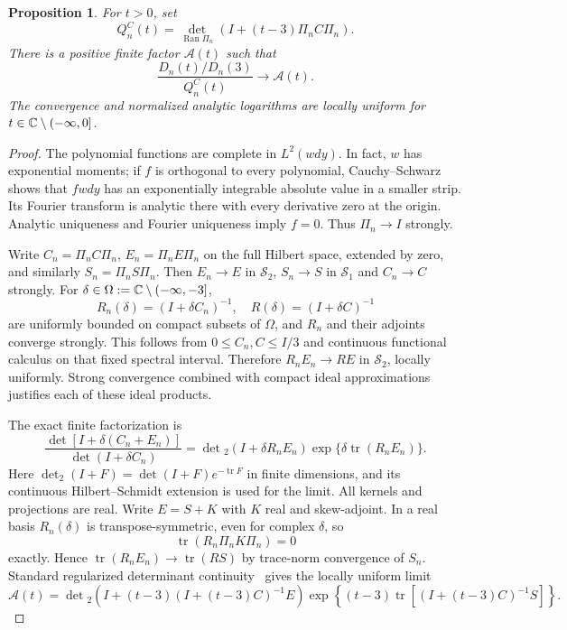 \documentclass[11pt,letterpaper]{article}
\newtheorem{proposition}[theorem]{Proposition}
\theoremstyle{remark}\newtheorem{remark}[theorem]{Remark}
\newcommand{\Sone}{\mathcal S_1}\newcommand{\Stwo}{\mathcal S_2}
\DeclareMathOperator{\tr}{tr}\DeclareMathOperator{\Ran}{Ran}
\begin{document}
\begin{proposition}\label{dsasm:log:relativeprop}
For $t>0$, set
\[
 Q_n^C(t)=\det_{\Ran\Pi_n}(I+(t-3)\Pi_n C\Pi_n).
\]
There is a positive finite factor $\mathcal A(t)$ such that
\begin{equation}\label{dsasm:log:relative}
 \frac{D_n(t)/D_n(3)}{Q_n^C(t)}\longrightarrow\mathcal A(t).
\end{equation}
The convergence and normalized analytic logarithms are locally
uniform for $t\in\mathbb C\setminus(-\infty,0]$.
\end{proposition}
\begin{proof}
The polynomial functions are complete in $L^2(wdy)$. In fact, $w$
has exponential moments; if $f$ is orthogonal to every polynomial,
Cauchy--Schwarz shows that $fwdy$ has an exponentially integrable
absolute value in a smaller strip. Its Fourier transform is analytic
there with every derivative zero at the origin. Analytic uniqueness
and Fourier uniqueness imply $f=0$. Thus $\Pi_n\to I$ strongly.

Write $C_n=\Pi_n C\Pi_n$, $E_n=\Pi_n E\Pi_n$ on the full Hilbert
space, extended by zero, and similarly $S_n=\Pi_n S\Pi_n$.
Then $E_n\to E$ in $\Stwo$, $S_n\to S$ in $\Sone$ and $C_n\to C$
strongly. For $\delta\in\Omega:=\mathbb C\setminus(-\infty,-3]$,
\[
 R_n(\delta)=(I+\delta C_n)^{-1},\quad R(\delta)=(I+\delta C)^{-1}
\]
are uniformly bounded on compact subsets of $\Omega$, and $R_n$ and
their adjoints converge strongly. This follows from
$0\le C_n,C\le I/3$ and continuous functional calculus on that fixed
spectral interval. Therefore $R_nE_n\to RE$ in $\Stwo$, locally
uniformly. Strong convergence combined with compact ideal
approximations justifies each of these ideal products.

The exact finite factorization is
\begin{equation}\label{dsasm:log:det2finite}
 \frac{\det[I+\delta(C_n+E_n)]}{\det(I+\delta C_n)}
 =\det{}_2(I+\delta R_nE_n)
       \exp\{\delta\tr(R_nE_n)\}.
\end{equation}
Here $\det_2(I+F)=\det(I+F)e^{-\tr F}$ in finite dimensions, and its
continuous Hilbert--Schmidt extension is used for the limit.
All kernels and projections are real. Write $E=S+K$ with $K$ real
and skew-adjoint. In a real basis $R_n(\delta)$ is transpose-symmetric,
even for complex $\delta$, so
\[
 \tr(R_n\Pi_nK\Pi_n)=0
\]
exactly. Hence $\tr(R_nE_n)\to\tr(RS)$ by trace-norm convergence
of $S_n$. Standard regularized determinant continuity~\cite{simon}
gives the locally uniform limit
\begin{equation}\label{dsasm:log:Aformula}
 \mathcal A(t)=\det{}_2\!\left(I+(t-3)(I+(t-3)C)^{-1}E\right)
 \exp\!\left\{(t-3)\tr[(I+(t-3)C)^{-1}S]\right\}.
\end{equation}


\end{proof}
\end{document}
